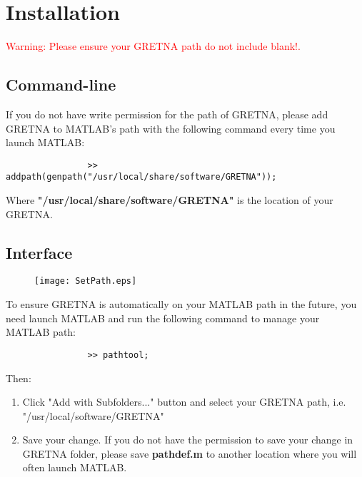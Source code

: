 \documentclass[11pt]{article}
\begin{document}
	\section{Installation}
		\textcolor{red}{Warning: Please ensure your GRETNA path do not include blank!.}
		\subsection{Command-line}
			If you do not have write permission for the path of GRETNA, 
			please add GRETNA to MATLAB's path with the following command every time you launch MATLAB:
			\begin{lstlisting}
				>> addpath(genpath("/usr/local/share/software/GRETNA"));
			\end{lstlisting}
			Where \textbf{"/usr/local/share/software/GRETNA"} is the location of your GRETNA.
		\subsection{Interface}
			\begin{figure}
				\begin{center}
					\texttt{[image: SetPath.eps]}
				\end{center}
			\end{figure}
			To ensure GRETNA is automatically on your MATLAB path in the future, 
			you need launch MATLAB and run the following command to manage your MATLAB path: 
			\begin{lstlisting}
				>> pathtool;
			\end{lstlisting}
			Then:
			\begin{enumerate}
				\item Click "Add with Subfolders..." button and 
					select your GRETNA path, i.e. "/usr/local/software/GRETNA"
				\item Save your change. If you do not have the permission to save your change in GRETNA folder, 
					please save \textbf{pathdef.m} to another location where you will often launch MATLAB.
			\end{enumerate}
\end{document}
